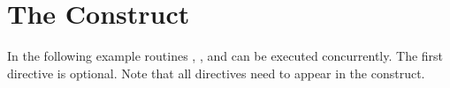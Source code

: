 \pagebreak
\chapter{The   Construct}
\label{chap:psections}

In the following example routines , , and  can 
be executed concurrently. The first  directive is optional. Note 
that all  directives need to appear in the  
construct.



